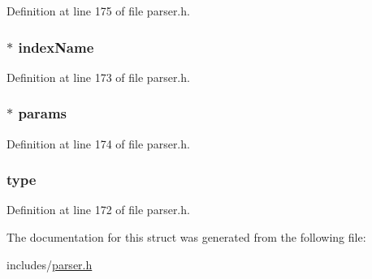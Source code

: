 Definition at line 175 of file parser.\+h.

\hypertarget{structfor__loop__ast__node_a4f446cf7b6976171f96394f7ac3254db}{
\subsubsection[{index\+Name}]{$\ast$ index\+Name}}\label{structfor__loop__ast__node_a4f446cf7b6976171f96394f7ac3254db}


Definition at line 173 of file parser.\+h.

\hypertarget{structfor__loop__ast__node_a25682f768036a8e8d6a3f34f59367049}{
\subsubsection[{params}]{$\ast$ params}}\label{structfor__loop__ast__node_a25682f768036a8e8d6a3f34f59367049}


Definition at line 174 of file parser.\+h.

\hypertarget{structfor__loop__ast__node_aa117a93354fa3056f51378be7065ce33}{
\subsubsection[{type}]{ type}}\label{structfor__loop__ast__node_aa117a93354fa3056f51378be7065ce33}


Definition at line 172 of file parser.\+h.



The documentation for this struct was generated from the following file\+:\begin{DoxyCompactItemize}
\item 
includes/\hyperlink{parser_8h}{parser.\+h}\end{DoxyCompactItemize}
